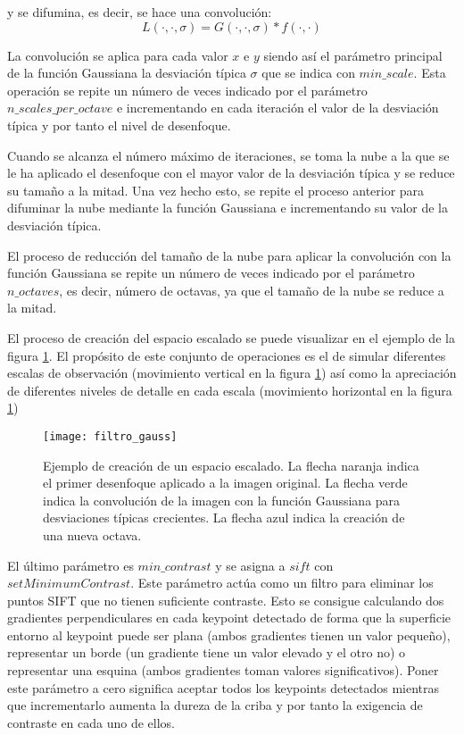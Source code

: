 y se difumina, es decir, se hace una convolución: 
$$L(\cdot,\cdot,\sigma)=G(\cdot,\cdot,\sigma)*f(\cdot,\cdot)$$

La convolución se aplica para cada valor $x$ e $y$ siendo así el parámetro principal de la función Gaussiana la desviación típica $\sigma$ que se indica con $min\_scale$. Esta operación se repite un número de veces indicado por el parámetro $n\_scales\_per\_octave$ e incrementando en cada iteración el valor de la desviación típica y por tanto el nivel de desenfoque.

Cuando se alcanza el número máximo de iteraciones, se toma la nube a la que se le ha aplicado el desenfoque con el mayor valor de la desviación típica y se reduce su tamaño a la mitad. Una vez hecho esto, se repite el proceso anterior para difuminar la nube mediante la función Gaussiana e incrementando su valor de la desviación típica. 

El proceso de reducción del tamaño de la nube para aplicar la convolución con la función Gaussiana se repite un número de veces indicado por el parámetro $n\_octaves$, es decir, número de octavas, ya que el tamaño de la nube se reduce a la mitad.

El proceso de creación del espacio escalado se puede visualizar en el ejemplo de la figura \ref{fig:filtro_gauss}. El propósito de este conjunto de operaciones es el de simular diferentes escalas de observación (movimiento vertical en la figura \ref{fig:filtro_gauss}) así como la apreciación de diferentes niveles de detalle en cada escala (movimiento horizontal en la figura \ref{fig:filtro_gauss})  

\begin{figure}
\centering
\texttt{[image: filtro\_gauss]}
\caption{Ejemplo de creación de un espacio escalado. La flecha naranja indica el primer desenfoque aplicado a la imagen original. La flecha verde indica la convolución de la imagen con la función Gaussiana para desviaciones típicas crecientes. La flecha azul indica la creación de una nueva octava.}\label{fig:filtro_gauss}
\end{figure}




El último parámetro es $min\_contrast$ y se asigna a $sift$ con $setMinimumContrast$. Este parámetro actúa como un filtro para eliminar los puntos SIFT que no tienen suficiente contraste. Esto se consigue calculando dos gradientes perpendiculares en cada keypoint detectado de forma que la superficie entorno al keypoint puede ser plana (ambos gradientes tienen un valor pequeño), representar un borde (un gradiente tiene un valor elevado y el otro no) o representar una esquina (ambos gradientes toman valores significativos). Poner este parámetro a cero significa aceptar todos los keypoints detectados mientras que incrementarlo aumenta la dureza de la criba y por tanto la exigencia de contraste en cada uno de ellos.


